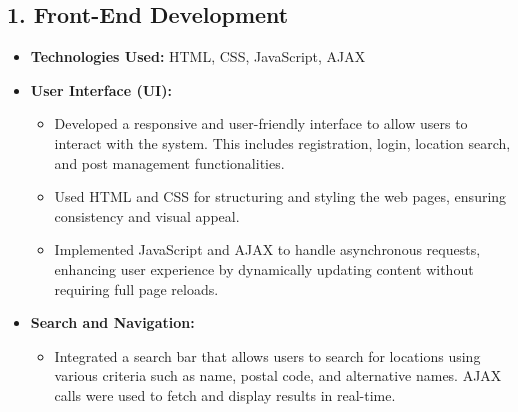 \subsection{1. Front-End Development}
\begin{itemize}
    \item \textbf{Technologies Used:} HTML, CSS, JavaScript, AJAX
    \item \textbf{User Interface (UI):}
        \begin{itemize}
            \item Developed a responsive and user-friendly interface to allow users to interact with the system. This includes registration, login, location search, and post management functionalities.
            \item Used HTML and CSS for structuring and styling the web pages, ensuring consistency and visual appeal.
            \item Implemented JavaScript and AJAX to handle asynchronous requests, enhancing user experience by dynamically updating content without requiring full page reloads.
        \end{itemize}
    \item \textbf{Search and Navigation:}
        \begin{itemize}
            \item Integrated a search bar that allows users to search for locations using various criteria such as name, postal code, and alternative names. AJAX calls were used to fetch and display results in real-time.
        \end{itemize}
\end{itemize}

